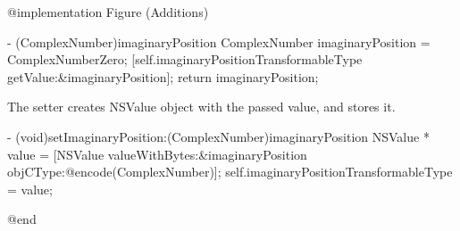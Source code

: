 \documentclass[10pt]{extarticle}
\newenvironment{codelisting}
{\footnotesize\mdframed[middlelinewidth=0.5pt, middlelinecolor=BaliHaiColor, skipabove=15pt]\verbatim}
{\endverbatim\endmdframed\vspace{12pt}\normalsize}
\begin{document}
\begin{codelisting}
@implementation Figure (Additions)

- (ComplexNumber)imaginaryPosition
{
    ComplexNumber imaginaryPosition = ComplexNumberZero;
    [self.imaginaryPositionTransformableType getValue:&imaginaryPosition];
    return imaginaryPosition;
}
\end{codelisting}

The setter creates NSValue object with the passed value, and stores it.

\begin{codelisting}
- (void)setImaginaryPosition:(ComplexNumber)imaginaryPosition
{
    NSValue * value = [NSValue valueWithBytes:&imaginaryPosition objCType:@encode(ComplexNumber)];
    self.imaginaryPositionTransformableType = value;
}

@end
\end{codelisting}
\end{document}
